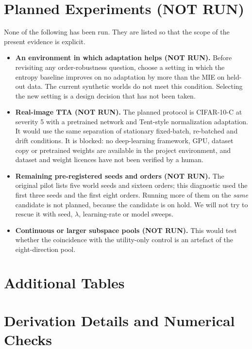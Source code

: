 \section{Planned Experiments (NOT RUN)}
\label{app:planned}
None of the following has been run. They are listed so that the scope of the present evidence is explicit.
\begin{itemize}
\item \textbf{An environment in which adaptation helps (NOT RUN).} Before revisiting any order-robustness
question, choose a setting in which the entropy baseline improves on no adaptation by more than the MIE on
held-out data. The current synthetic worlds do not meet this condition. Selecting the new setting is a design
decision that has not been taken.
\item \textbf{Real-image TTA (NOT RUN).} The planned protocol is CIFAR-10-C at severity 5 with a pretrained
network and Tent-style normalization adaptation. It would use the same separation of stationary fixed-batch,
re-batched and drift conditions. It is blocked: no deep-learning framework, GPU, dataset copy or pretrained
weights are available in the project environment, and dataset and weight licences have not been verified by a
human.
\item \textbf{Remaining pre-registered seeds and orders (NOT RUN).} The original pilot lists five world seeds
and sixteen orders; this diagnostic used the first three seeds and the first eight orders. Running more of
them on the \emph{same} candidate is not planned, because the candidate is on hold. We will not try to rescue
it with seed, $\lambda$, learning-rate or model sweeps.
\item \textbf{Continuous or larger subspace pools (NOT RUN).} This would test whether the coincidence with
the utility-only control is an artefact of the eight-direction pool.
\end{itemize}

\clearpage
\section{Additional Tables}
\label{app:tables}







\clearpage
\section{Derivation Details and Numerical Checks}
\label{app:derivation}

